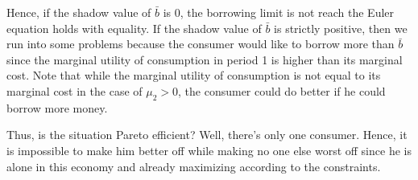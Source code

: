 \documentclass[12pt]{article}
\newcommand{\1}{{\bf 1}} %
\begin{document}
\begin{enumerate}[(1)]
	Hence, if the shadow value of $\bar{b}$ is 0, the borrowing limit is not reach the Euler equation holds with equality. If the shadow value of $\bar{b}$ is strictly positive, then we run into some problems because the consumer would like to borrow more than $\bar{b}$ since the marginal utility of consumption in period 1 is higher than its marginal cost. Note that while the marginal utility of consumption is not equal to its marginal cost in the case of $\mu_2>0$, the consumer could do better if he could borrow more money. 
	
	Thus, is the situation Pareto efficient? Well, there's only one consumer. Hence, it is impossible to make him better off while making no one else worst off since he is alone in this economy and already maximizing according to the constraints.
\end{enumerate}
\end{document}
